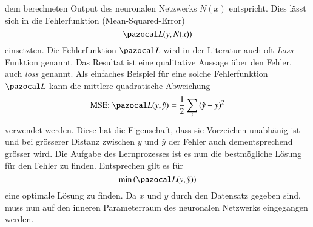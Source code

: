 dem berechneten Output des neuronalen Netzwerks $N(x)$ entspricht. Dies lässt sich in die Fehlerfunktion (Mean-Squared-Error)
\begin{equation}
\Lb(y,N(x))
\end{equation}
einsetzten.
Die Fehlerfunktion $\Lb$ wird in der Literatur auch oft \textit{Loss}-Funktion genannt. Das Resultat ist eine qualitative Aussage über den Fehler, auch \textit{loss} genannt. Als einfaches Beispiel für eine solche Fehlerfunktion $\Lb$ kann die mittlere quadratische Abweichung 
\begin{equation}
\text{MSE: } \Lb (y, \hat{y}) = \frac{1}{2} \sum_i \left( \hat{y} - y \right)^2
\label{ableitung:eqn:loss}
\end{equation}
verwendet werden. Diese hat die Eigenschaft, dass sie Vorzeichen unabhänig ist und bei grösserer Distanz zwischen $y$ und $\hat{y}$ der Fehler auch dementsprechend grösser wird.
Die Aufgabe des Lernprozesses ist es nun die bestmögliche Lösung für den Fehler zu finden. Entsprechen gilt es für
\begin{equation}
	\min \left( \Lb(y,\hat{y}) \right) 
	\label{ableitung:eqn:min_loss}
\end{equation}
eine optimale Lösung zu finden. Da $x$ und $y$ durch den Datensatz gegeben sind, muss nun auf den inneren Parameterraum des neuronalen Netzwerks eingegangen werden.

